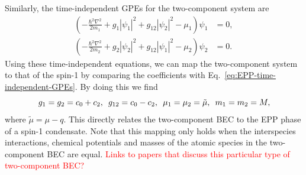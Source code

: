 Similarly, the time-independent GPEs for the two-component system are
\begin{equation}
    \begin{aligned}
        \left(-\frac{\hbar^2\nabla^2}{2m_1} + g_1|\psi_1|^2
        +g_{12}|\psi_2|^2 - \mu_1\right)\psi_1 &= 0, \\
        \left(-\frac{\hbar^2\nabla^2}{2m_2} + g_2|\psi_2|^2
        +g_{12}|\psi_1|^2 - \mu_2\right)\psi_2 &= 0.
    \end{aligned}
    \label{eq:two-comp-time-independent-gpes}
\end{equation}
Using these time-independent equations, we can map the two-component system
to that of the spin-1 by comparing the coefficients with
Eq.~\eqref{eq:EPP-time-independent-GPEs}.
By doing this we find
\begin{equation}
    g_1=g_2=c_0+c_2, \enskip g_{12} = c_0-c_2, \enskip \mu_1=\mu_2=\tilde{\mu}, 
    \enskip m_1=m_2=M,
\end{equation}
where $\tilde{\mu} = \mu - q$.
This directly relates the two-component BEC to the EPP phase of a spin-1
condensate.
Note that this mapping only holds when the interspecies interactions, chemical
potentials and masses of the atomic species in the two-component BEC are equal.
\textcolor{red}{Links to papers that discuss this particular type of
two-component BEC?}



